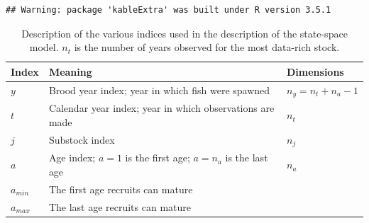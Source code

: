 \documentclass[12pt,]{book}
\theoremstyle{definition}
\theoremstyle{definition}
\theoremstyle{definition}
\theoremstyle{remark}
\begin{document}
\begin{verbatim}
## Warning: package 'kableExtra' was built under R version 3.5.1
\end{verbatim}

\begin{table}

\caption{\label{tab:ch4-notation-table}Description of the various indices used in the description of the state-space model. $n_t$ is the number of years observed for the most data-rich stock.}
\centering
\begin{tabular}[t]{l>{\raggedright\arraybackslash}p{25em}>{\raggedright\arraybackslash}p{10em}}
\toprule
\textbf{Index} & \textbf{Meaning} & \textbf{Dimensions}\\
\midrule
$y$ & Brood year index; year in which fish were spawned & $n_y=n_t + n_a - 1$\\
$t$ & Calendar year index; year in which observations are made & $n_t$\\
$j$ & Substock index & $n_j$\\
$a$ & Age index; $a=1$ is the first age; $a=n_a$ is the last age & $n_a$\\
$a_{min}$ & The first age recruits can mature & 1\\
$a_{max}$ & The last age recruits can mature & 1\\
\bottomrule
\end{tabular}
\end{table}

\clearpage
\end{document}
